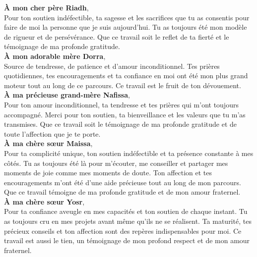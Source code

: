 \begin{center}
  \begin{minipage}{0.85\textwidth}
    \centering
    \normalsize\itshape

    \textbf{À mon cher père Riadh},\\

    Pour ton soutien indéfectible, ta sagesse et les sacrifices que tu as consentis pour faire de moi la personne que je suis aujourd'hui. Tu as toujours été mon modèle de rigueur et de persévérance. Que ce travail soit le reflet de ta fierté et le témoignage de ma profonde gratitude.\\

    \textbf{À mon adorable mère Dorra},\\

    Source de tendresse, de patience et d'amour inconditionnel. Tes prières quotidiennes, tes encouragements et ta confiance en moi ont été mon plus grand moteur tout au long de ce parcours. Ce travail est le fruit de ton dévouement.\\

     \textbf{À ma précieuse grand-mère Nafissa},\\

  Pour ton amour inconditionnel, ta tendresse et tes prières qui m’ont toujours accompagné. Merci pour ton soutien, ta bienveillance et les valeurs que tu m’as transmises. Que ce travail soit le témoignage de ma profonde gratitude et de toute l’affection que je te porte.\\

    \textbf{À ma chère sœur Maissa},\\

    Pour ta complicité unique, ton soutien indéfectible et ta présence constante à mes côtés. Tu as toujours été là pour m'écouter, me conseiller et partager mes moments de joie comme mes moments de doute. Ton affection et tes encouragements m'ont été d'une aide précieuse tout au long de mon parcours. Que ce travail témoigne de ma profonde gratitude et de mon amour fraternel.\\

    \textbf{À ma chère sœur Yosr},\\

    Pour ta confiance aveugle en mes capacités et ton soutien de chaque instant. Tu as toujours cru en mes projets avant même qu'ils ne se réalisent. Ta maturité, tes précieux conseils et ton affection sont des repères indispensables pour moi. Ce travail est aussi le tien, un témoignage de mon profond respect et de mon amour fraternel.\\


\end{minipage}
\end{center}
